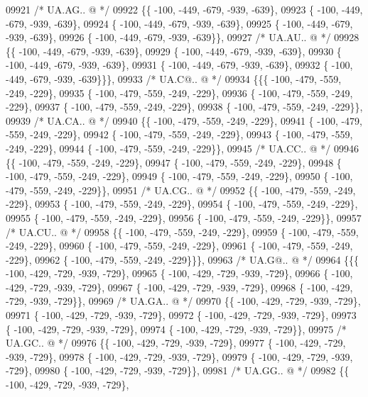\begin{DoxyCode}
09921 \textcolor{comment}{/* UA.AG.. @ */}
09922 \{\{ -100, -449, -679, -939, -639\},
09923 \{ -100, -449, -679, -939, -639\},
09924 \{ -100, -449, -679, -939, -639\},
09925 \{ -100, -449, -679, -939, -639\},
09926 \{ -100, -449, -679, -939, -639\}\},
09927 \textcolor{comment}{/* UA.AU.. @ */}
09928 \{\{ -100, -449, -679, -939, -639\},
09929 \{ -100, -449, -679, -939, -639\},
09930 \{ -100, -449, -679, -939, -639\},
09931 \{ -100, -449, -679, -939, -639\},
09932 \{ -100, -449, -679, -939, -639\}\}\},
09933 \textcolor{comment}{/* UA.C@.. @ */}
09934 \{\{\{ -100, -479, -559, -249, -229\},
09935 \{ -100, -479, -559, -249, -229\},
09936 \{ -100, -479, -559, -249, -229\},
09937 \{ -100, -479, -559, -249, -229\},
09938 \{ -100, -479, -559, -249, -229\}\},
09939 \textcolor{comment}{/* UA.CA.. @ */}
09940 \{\{ -100, -479, -559, -249, -229\},
09941 \{ -100, -479, -559, -249, -229\},
09942 \{ -100, -479, -559, -249, -229\},
09943 \{ -100, -479, -559, -249, -229\},
09944 \{ -100, -479, -559, -249, -229\}\},
09945 \textcolor{comment}{/* UA.CC.. @ */}
09946 \{\{ -100, -479, -559, -249, -229\},
09947 \{ -100, -479, -559, -249, -229\},
09948 \{ -100, -479, -559, -249, -229\},
09949 \{ -100, -479, -559, -249, -229\},
09950 \{ -100, -479, -559, -249, -229\}\},
09951 \textcolor{comment}{/* UA.CG.. @ */}
09952 \{\{ -100, -479, -559, -249, -229\},
09953 \{ -100, -479, -559, -249, -229\},
09954 \{ -100, -479, -559, -249, -229\},
09955 \{ -100, -479, -559, -249, -229\},
09956 \{ -100, -479, -559, -249, -229\}\},
09957 \textcolor{comment}{/* UA.CU.. @ */}
09958 \{\{ -100, -479, -559, -249, -229\},
09959 \{ -100, -479, -559, -249, -229\},
09960 \{ -100, -479, -559, -249, -229\},
09961 \{ -100, -479, -559, -249, -229\},
09962 \{ -100, -479, -559, -249, -229\}\}\},
09963 \textcolor{comment}{/* UA.G@.. @ */}
09964 \{\{\{ -100, -429, -729, -939, -729\},
09965 \{ -100, -429, -729, -939, -729\},
09966 \{ -100, -429, -729, -939, -729\},
09967 \{ -100, -429, -729, -939, -729\},
09968 \{ -100, -429, -729, -939, -729\}\},
09969 \textcolor{comment}{/* UA.GA.. @ */}
09970 \{\{ -100, -429, -729, -939, -729\},
09971 \{ -100, -429, -729, -939, -729\},
09972 \{ -100, -429, -729, -939, -729\},
09973 \{ -100, -429, -729, -939, -729\},
09974 \{ -100, -429, -729, -939, -729\}\},
09975 \textcolor{comment}{/* UA.GC.. @ */}
09976 \{\{ -100, -429, -729, -939, -729\},
09977 \{ -100, -429, -729, -939, -729\},
09978 \{ -100, -429, -729, -939, -729\},
09979 \{ -100, -429, -729, -939, -729\},
09980 \{ -100, -429, -729, -939, -729\}\},
09981 \textcolor{comment}{/* UA.GG.. @ */}
09982 \{\{ -100, -429, -729, -939, -729\},

\end{DoxyCode}
